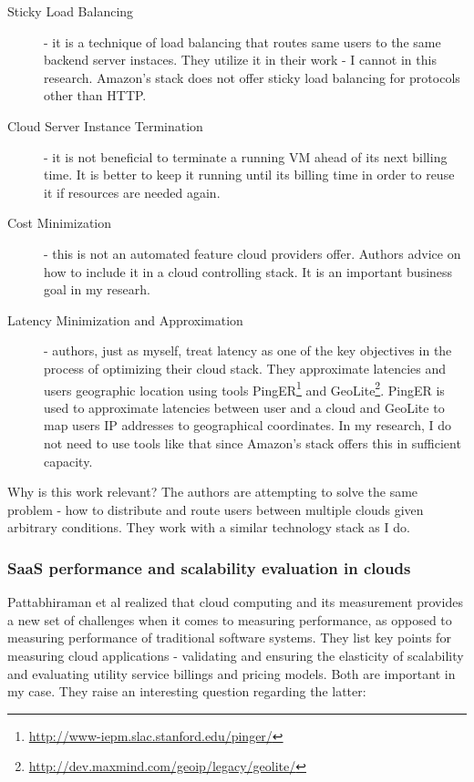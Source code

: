 \documentclass{uvamscse}
\begin{document}
\begin{description}
  \item[Sticky Load Balancing] - it is a technique of load balancing that routes same users to the same backend server instaces. They utilize it in their work - I cannot in this research. Amazon's stack does not offer sticky load balancing for protocols other than HTTP.
  \item[Cloud Server Instance Termination] - it is not beneficial to terminate a running VM ahead of its next billing time. It is better to keep it running until its billing time in order to reuse it if resources are needed again.
  \item[Cost Minimization] - this is not an automated feature cloud providers offer. Authors advice on how to include it in a cloud controlling stack. It is an important business goal in my researh.
  \item[Latency Minimization and Approximation] - authors, just as myself, treat latency as one of the key objectives in the process of optimizing their cloud stack. They approximate latencies and users geographic location using tools PingER\footnote{\url{http://www-iepm.slac.stanford.edu/pinger/}} and GeoLite\footnote{\url{http://dev.maxmind.com/geoip/legacy/geolite/}}. PingER is used to approximate latencies between user and a cloud and GeoLite to map users IP addresses to geographical coordinates. In my research, I do not need to use tools like that since Amazon's stack offers this in sufficient capacity.
\end{description}

Why is this work relevant? The authors are attempting to solve the same problem - how to distribute and route users between multiple clouds given arbitrary conditions. They work with a similar technology stack as I do.

\subsubsection{SaaS performance and scalability evaluation in clouds}

Pattabhiraman et al realized that cloud computing and its measurement provides a new set of challenges when it comes to measuring performance, as opposed to measuring performance of traditional software systems. They list key points for measuring cloud applications - validating and ensuring the elasticity of scalability and evaluating utility service billings and pricing models. Both are important in my case. They raise an interesting question regarding the latter:
\end{document}
